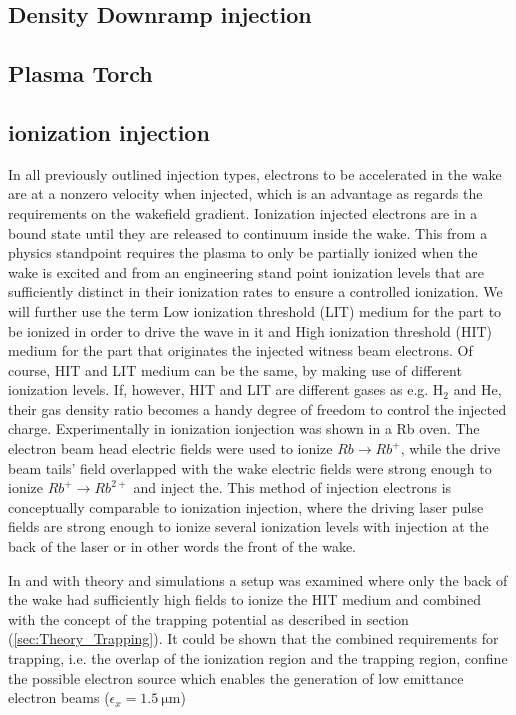 \subsection{Density Downramp injection}

\subsection{Plasma Torch}
\cite{PlaTo,PlaTo2}
\subsection{ionization injection}
In all previously outlined injection types, electrons to be accelerated in the wake are at a nonzero velocity when injected, which is an advantage as regards the requirements on the wakefield gradient. Ionization injected electrons are in a bound state until they are released to continuum inside the wake. This from a physics standpoint requires the plasma to only be partially ionized when the wake is excited and from an engineering stand point ionization levels that are sufficiently distinct in their ionization rates to ensure a controlled ionization. We will further use the term Low ionization threshold (LIT) medium for the part to be ionized in order to drive the wave in it and High ionization threshold (HIT) medium for the part that originates the injected witness beam electrons. Of course, HIT and LIT medium can be the same, by making use of different ionization levels. If, however, HIT and LIT are different gases as e.g. H$_2$ and He, their gas density ratio becomes a handy degree of freedom to control the injected charge.
Experimentally in \cite{Navid_distributed_PRL} ionization ionjection was shown in a Rb oven. The electron beam head electric fields were used to ionize $Rb\rightarrow Rb^+$, while the drive beam tails' field overlapped with the wake electric fields were strong enough to ionize $Rb^+ \rightarrow Rb^{2+}$ and inject the. This method of injection electrons is conceptually comparable to ionization injection, where the driving laser pulse fields are strong enough to ionize several ionization levels with injection at the back of the laser or in other words the front of the wake\cite{Pak_Ion_InjectionPRL2010}.

In \cite{Ossa_Rake_PRL2013} and \cite{MartinezdelaOssa2014231} with theory and simulations a setup was examined where only the back of the wake had sufficiently high fields to ionize the HIT medium and combined with the concept of the trapping potential as described in section (\ref{sec:Theory_Trapping}). It could be shown that the combined requirements for trapping, i.e. the overlap of the ionization region and the trapping region, confine the possible electron source which enables the generation of low emittance electron beams ($\epsilon_x=1.5\ \mathrm{\mu m}$) 




